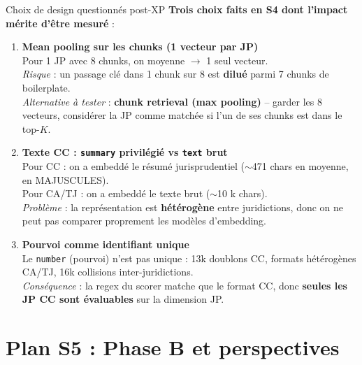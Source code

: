 \documentclass[aspectratio=169,10pt]{beamer}
\begin{document}
\begin{frame}{Choix de design questionnés post-XP}
  \footnotesize
  \textbf{Trois choix faits en S4 dont l'impact mérite d'être mesuré} :

  \vspace{0.5em}
  \begin{enumerate}
    \item \textbf{Mean pooling sur les chunks (1 vecteur par JP)} \\
    \footnotesize Pour 1 JP avec 8 chunks, on moyenne $\to$ 1 seul vecteur. \\
    \textit{Risque} : un passage clé dans 1 chunk sur 8 est \textbf{dilué} parmi 7 chunks de boilerplate. \\
    \textit{Alternative à tester} : \textbf{chunk retrieval (max pooling)} -- garder les 8 vecteurs, considérer la JP comme matchée si l'un de ses chunks est dans le top-$K$.

    \vspace{0.4em}
    \item \textbf{Texte CC : \texttt{summary} privilégié vs \texttt{text} brut} \\
    \footnotesize Pour CC : on a embeddé le résumé jurisprudentiel ($\sim$471 chars en moyenne, en MAJUSCULES). \\
    Pour CA/TJ : on a embeddé le texte brut ($\sim$10 k chars). \\
    \textit{Problème} : la représentation est \textbf{hétérogène} entre juridictions, donc on ne peut pas comparer proprement les modèles d'embedding.

    \vspace{0.4em}
    \item \textbf{Pourvoi comme identifiant unique} \\
    \footnotesize Le \texttt{number} (pourvoi) n'est pas unique : 13k doublons CC, formats hétérogènes CA/TJ, 16k collisions inter-juridictions. \\
    \textit{Conséquence} : la regex du scorer matche que le format CC, donc \textbf{seules les JP CC sont évaluables} sur la dimension JP.
  \end{enumerate}
\end{frame}

\section{Plan S5 : Phase B et perspectives}
\end{document}
